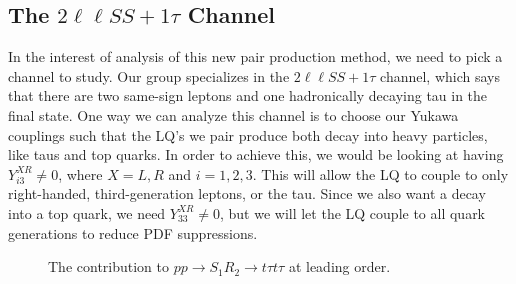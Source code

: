         \subsection{The \texorpdfstring{$2\ell\ell SS+1\tau$}{2llSS+1tau} Channel}
            In the interest of analysis of this new pair production method, we need to pick a channel to study. Our group specializes in the $2\ell\ell SS+1\tau$ channel, which says that there are two same-sign leptons and one hadronically decaying tau in the final state. One way we can analyze this channel is to choose our Yukawa couplings such that the LQ's we pair produce both decay into heavy particles, like taus and top quarks. In order to achieve this, we would be looking at having $Y^{XR}_{i3} \neq 0$, where $X=L,R$ and $i=1,2,3$. This will allow the LQ to couple to only right-handed, third-generation leptons, or the tau. Since we also want a decay into a top quark, we need $Y^{XR}_{33} \neq 0$, but we will let the LQ couple to all quark generations to reduce PDF suppressions.


            \begin{figure}[t]
                \centering

                
                \caption{The contribution to $pp \rightarrow S_1R_2 \rightarrow t\tau t\tau$ at leading order.}
                \label{mainContribution}
            \end{figure}
            
